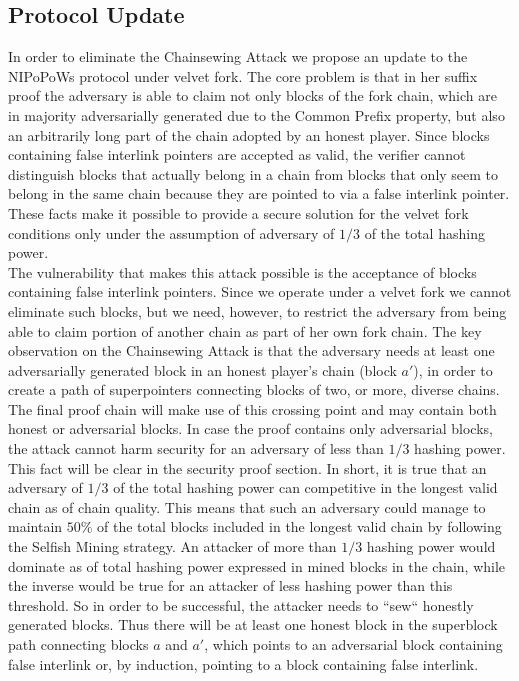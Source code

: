 \documentclass[11pt,a4paper]{article}
\begin{document}
\subsection{Protocol Update}

In order to eliminate the Chainsewing Attack we propose an update to the NIPoPoWs protocol under velvet fork. The core problem is that in her suffix proof the adversary is able to claim not only blocks of the fork chain,  which are in majority adversarially generated due to the Common Prefix property, but also an arbitrarily long part of the chain adopted by an honest player. Since blocks containing false interlink pointers are accepted as valid, the verifier cannot distinguish blocks that actually belong in a chain from blocks that only seem to belong in the same chain because they are pointed to via a false interlink pointer. \\

These facts make it possible to provide a secure solution for the velvet fork conditions only under the assumption of adversary of $1/3$ of the total hashing power.\\

The vulnerability that makes this attack possible is the acceptance of blocks containing false interlink pointers. Since we operate under a velvet fork we cannot eliminate such blocks, but we need, however, to restrict the adversary from being able to claim portion of another chain as part of her own fork chain. 
The key observation on the Chainsewing Attack is that the adversary needs at least one adversarially generated block in an honest player's chain (block $a'$), in order to create a path of superpointers connecting blocks of two, or more, diverse chains. The final proof chain will make use of this crossing point and may contain both honest or adversarial blocks. 
In case the proof contains only adversarial blocks, the attack cannot harm security for an adversary of less than $1/3$ hashing power. This fact will be clear in the security proof section. In short, it is true that an adversary of $1/3$ of the total hashing power can competitive in the longest valid chain as of chain quality. This means that such an adversary could manage to maintain $50\%$ of the total blocks included in the longest valid chain by following the Selfish Mining strategy\cite{selfish_mining}. An attacker of more than $1/3$ hashing power would dominate as of total hashing power expressed in mined blocks in the chain, while the inverse would be true for an attacker of less hashing power than this threshold.
So in order to be successful, the attacker needs to ``sew`` honestly generated blocks. Thus there will be at least one honest block in the superblock path connecting blocks $a$ and $a'$, which points to an adversarial block containing false interlink or, by induction, pointing to a block containing false interlink.
\end{document}
